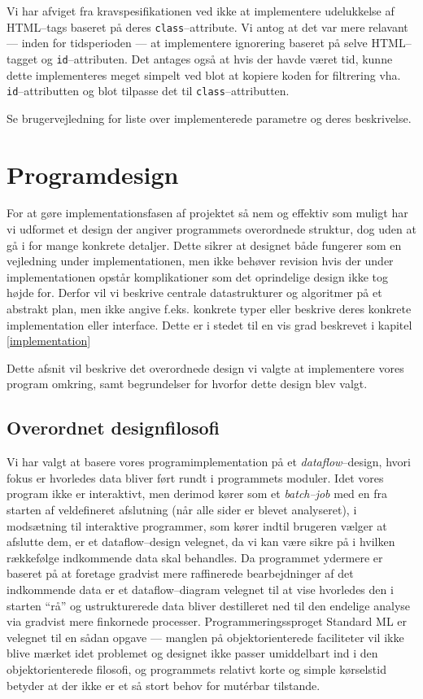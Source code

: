 \documentclass[a4paper,oneside]{memoir}
\begin{document}
Vi har afviget fra kravspesifikationen ved ikke at implementere udelukkelse af
HTML--tags baseret på deres \texttt{class}--attribute. Vi antog at det var mere
relavant --- inden for tidsperioden --- at implementere ignorering baseret på
selve HTML--tagget og \texttt{id}--attributen. Det antages også at hvis der
havde været tid, kunne dette implementeres meget simpelt ved blot at kopiere
koden for filtrering vha. \texttt{id}--attributten og blot tilpasse det til
\texttt{class}--attributten.

Se brugervejledning for liste over implementerede parametre og deres
beskrivelse.

\chapter{Programdesign}

For at gøre implementationsfasen af projektet så nem og effektiv som
muligt har vi udformet et design der angiver programmets overordnede
struktur, dog uden at gå i for mange konkrete detaljer. Dette sikrer
at designet både fungerer som en vejledning under implementationen,
men ikke behøver revision hvis der under implementationen opstår
komplikationer som det oprindelige design ikke tog højde for. Derfor
vil vi beskrive centrale datastrukturer og algoritmer på et abstrakt
plan, men ikke angive f.eks. konkrete typer eller beskrive deres
konkrete implementation eller interface. Dette er i stedet til en vis
grad beskrevet i kapitel \ref{implementation}

Dette afsnit vil beskrive det overordnede design vi valgte at
implementere vores program omkring, samt begrundelser for hvorfor
dette design blev valgt.

\section{Overordnet designfilosofi}
\label{overordnetdesign}
Vi har valgt at basere vores programimplementation på et
\textit{dataflow}--design, hvori fokus er hvorledes data bliver ført
rundt i programmets moduler. Idet vores program ikke er interaktivt,
men derimod kører som et \textit{batch--job} med en fra starten af
veldefineret afslutning (når alle sider er blevet analyseret), i
modsætning til interaktive programmer, som kører indtil brugeren
vælger at afslutte dem, er et dataflow--design velegnet, da vi kan
være sikre på i hvilken rækkefølge indkommende data skal behandles. Da
programmet ydermere er baseret på at foretage gradvist mere
raffinerede bearbejdninger af det indkommende data er et
dataflow--diagram velegnet til at vise hvorledes den i starten ``rå''
og ustrukturerede data bliver destilleret ned til den endelige analyse
via gradvist mere finkornede processer. Programmeringssproget Standard
ML er velegnet til en sådan opgave --- manglen på objektorienterede
faciliteter vil ikke blive mærket idet problemet og designet ikke
passer umiddelbart ind i den objektorienterede filosofi, og
programmets relativt korte og simple kørselstid betyder at der ikke er
et så stort behov for mutérbar tilstande. 
\end{document}
